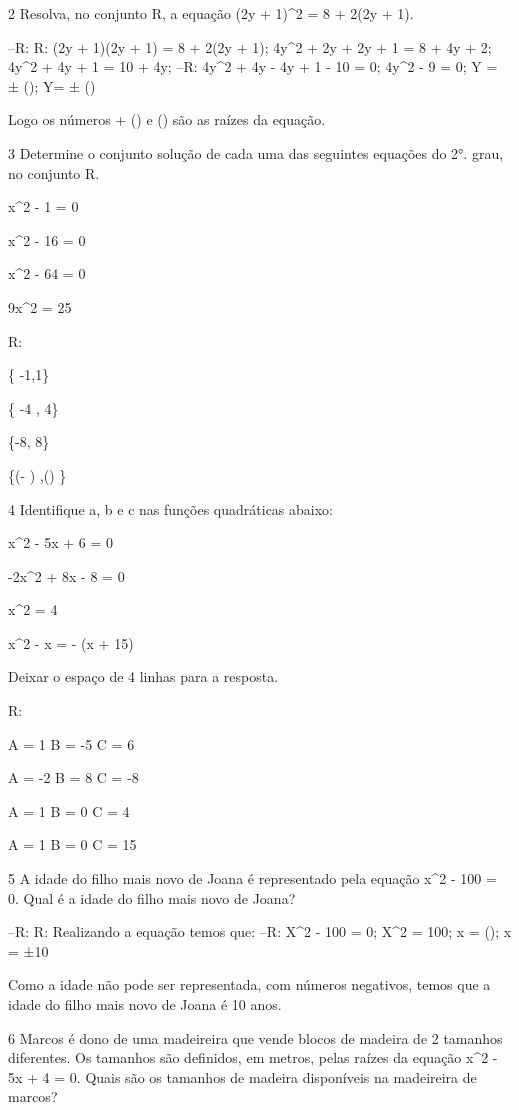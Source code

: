 {\num{2} Resolva, no conjunto R, a equação (2y + 1)^2 = 8 + 2(2y + 1).

--R: R: (2y + 1)(2y + 1) = 8 + 2(2y + 1); 4y^2 + 2y + 2y + 1 = 8 + 4y + 2; 4y^2 + 4y + 1 = 10 + 4y; 
--R: 4y^2 + 4y - 4y + 1 - 10 = 0; 4y^2 - 9 = 0; Y = ± (); Y= ± ()

Logo os números + () e () são as raízes da
equação.

\num{3} Determine o conjunto solução de cada uma das seguintes equações do
2°. grau, no conjunto R.
\item x^2 - 1 = 0
\item x^2 - 16 = 0
\item x^2 - 64 = 0
\item 9x^2 = 25

R:
\item \{ -1,1\}
\item \{ -4 , 4\}
\item \{-8, 8\}
\item \{(- ) ,() \}

\num{4} Identifique a, b e c nas funções quadráticas abaixo:
\item x^2 - 5x + 6 = 0
\item -2x^2 + 8x - 8 = 0
\item x^2 = 4
\item x^2 - x = - (x + 15)

Deixar o espaço de 4 linhas para a resposta.

R:
\item
A = 1
B = -5
C = 6
\item
A = -2
B = 8
C = -8
\item
A = 1
B = 0
C = 4
\item
A = 1
B = 0
C = 15

\num{5} A idade do filho mais novo de Joana é representado pela equação x^2 -
100 = 0. Qual é a idade do filho mais novo de Joana?

--R: R: Realizando a equação temos que:
--R: X^2 - 100 = 0; X^2 = 100; x = (); x = ±10

Como a idade não pode ser representada, com números negativos, temos que
a idade do filho mais novo de Joana é 10 anos.

\num{6} Marcos é dono de uma madeireira que vende blocos de madeira de 2
tamanhos diferentes. Os tamanhos são definidos, em metros, pelas raízes
da equação x^2 - 5x + 4 = 0. Quais são os tamanhos de madeira disponíveis
na madeireira de marcos?

}

